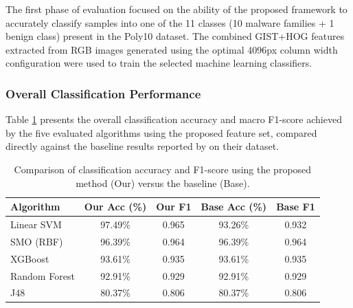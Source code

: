 The first phase of evaluation focused on the ability of the proposed framework to accurately classify samples into one of the 11 classes (10 malware families + 1 benign class) present in the Poly10 dataset. The combined GIST+HOG features extracted from RGB images generated using the optimal 4096px column width configuration were used to train the selected machine learning classifiers.

\subsubsection{Overall Classification Performance}
\label{subsubsec:overall_perf}

Table \ref{tab:classification_comparison} presents the overall classification accuracy and macro F1-score achieved by the five evaluated algorithms using the proposed feature set, compared directly against the baseline results reported by \cite{bozkir2021catch} on their dataset.

\begin{table}[h!]
  \centering
  \captionsetup{labelformat=empty, textformat=simple} %
  \caption{TABLE I: CLASSIFICATION PERFORMANCE COMPARISON}
  \label{tab:classification_comparison}
  \begin{tabular}{lcccc}
    \toprule
    \textbf{Algorithm} & \textbf{Our Acc (\%)} & \textbf{Our F1} & \textbf{Base Acc (\%)} & \textbf{Base F1} \\
    \midrule
    Linear SVM      & 97.49\% & 0.965 & 93.26\% & 0.932 \\
    SMO (RBF)       & 96.39\% & 0.964 & 96.39\% & 0.964 \\
    XGBoost         & 93.61\% & 0.935 & 93.61\% & 0.935 \\
    Random Forest   & 92.91\% & 0.929 & 92.91\% & 0.929 \\
    J48             & 80.37\% & 0.806 & 80.37\% & 0.806 \\
    \bottomrule
  \end{tabular}
  \vspace{0.2cm} %
  \caption*{Comparison of classification accuracy and F1-score using the proposed method (Our) versus the baseline \citep{bozkir2021catch} (Base).} %
\end{table}


